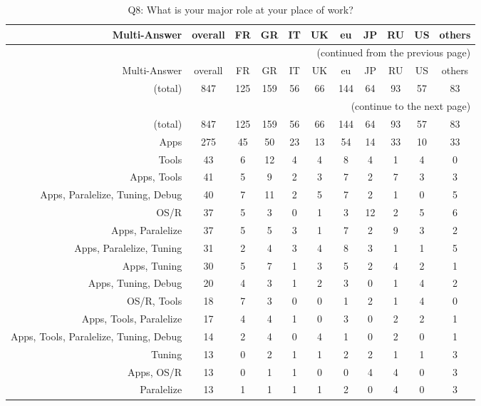 \clearpage%
{\footnotesize\begin{landscape}%
\begin{longtable}[htb]{r|c|c|c|c|c|c|c|c|c|c}%
\caption{Q8: What is your major role at your place of work?}%
\label{tab:Q8-mans} \\%
\hline%
Multi-Answer & overall & FR & GR & IT & UK & eu & JP & RU & US & others \\
 \hline%
\endfirsthead%
\multicolumn{11}{r}{(continued from the previous page)}\\%
\hline%
Multi-Answer & overall & FR & GR & IT & UK & eu & JP & RU & US & others \\
 \hline%
\endhead%
\hline%
(total) & 847 & 125 & 159 & 56 & 66 & 144 & 64 & 93 & 57 & 83 \\%
\hline%
\multicolumn{11}{r}{(continue to the next page)}\\%
\endfoot%
\hline%
(total) & 847 & 125 & 159 & 56 & 66 & 144 & 64 & 93 & 57 & 83 \\%
\hline%
\endlastfoot%
\hline%
{Apps} & 275 & 45 & 50 & 23 & 13 & 54 & 14 & 33 & 10 & 33 \\%
{Tools} & 43 & 6 & 12 & 4 & 4 & 8 & 4 & 1 & 4 & 0 \\%
{Apps, Tools} & 41 & 5 & 9 & 2 & 3 & 7 & 2 & 7 & 3 & 3 \\%
{Apps, Paralelize, Tuning, Debug} & 40 & 7 & 11 & 2 & 5 & 7 & 2 & 1 & 0 & 5 \\%
{OS/R} & 37 & 5 & 3 & 0 & 1 & 3 & 12 & 2 & 5 & 6 \\%
{Apps, Paralelize} & 37 & 5 & 5 & 3 & 1 & 7 & 2 & 9 & 3 & 2 \\%
{Apps, Paralelize, Tuning} & 31 & 2 & 4 & 3 & 4 & 8 & 3 & 1 & 1 & 5 \\%
{Apps, Tuning} & 30 & 5 & 7 & 1 & 3 & 5 & 2 & 4 & 2 & 1 \\%
{Apps, Tuning, Debug} & 20 & 4 & 3 & 1 & 2 & 3 & 0 & 1 & 4 & 2 \\%
{OS/R, Tools} & 18 & 7 & 3 & 0 & 0 & 1 & 2 & 1 & 4 & 0 \\%
{Apps, Tools, Paralelize} & 17 & 4 & 4 & 1 & 0 & 3 & 0 & 2 & 2 & 1 \\%
{Apps, Tools, Paralelize, Tuning, Debug} & 14 & 2 & 4 & 0 & 4 & 1 & 0 & 2 & 0 & 1 \\%
{Tuning} & 13 & 0 & 2 & 1 & 1 & 2 & 2 & 1 & 1 & 3 \\%
{Apps, OS/R} & 13 & 0 & 1 & 1 & 0 & 0 & 4 & 4 & 0 & 3 \\%
{Paralelize} & 13 & 1 & 1 & 1 & 1 & 2 & 0 & 4 & 0 & 3 \\%

\end{longtable}
\end{landscape}}
